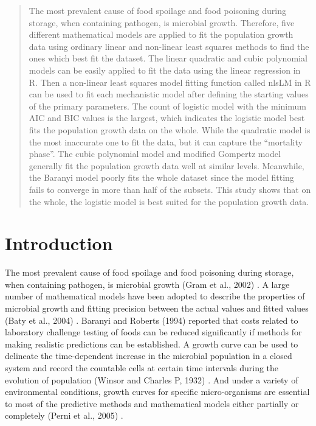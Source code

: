 \documentclass[11pt, a4paper]{article}
\begin{document}

\tableofcontents
\runninglinenumbers
\begin{abstract}
	The most prevalent cause of food spoilage and food poisoning during storage, when containing pathogen, is microbial growth. Therefore, five different mathematical models are applied to fit the population growth data using ordinary linear and non-linear least squares methods to find the ones which best fit the dataset. The linear quadratic and cubic polynomial models can be easily applied to fit the data using the linear regression in R. Then a non-linear least squares model fitting function called nlsLM in R can be used to fit each mechanistic model after defining the starting values of the primary parameters. The count of logistic model with the minimum AIC and BIC values is the largest, which indicates the logistic model best fits the population growth data on the whole. While the quadratic model is the most inaccurate one to fit the data, but it can capture the “mortality phase”. The cubic polynomial model and modified Gompertz model generally fit the population growth data well at similar levels. Meanwhile, the Baranyi model poorly fits the whole dataset since the model fitting fails to converge in more than half of the subsets. This study shows that on the whole, the logistic model is best suited for the population growth data.
\end{abstract}


\section{Introduction}
The most prevalent cause of food spoilage and food poisoning during storage, when containing pathogen, is microbial growth (Gram et al., 2002) \cite{gram2002food}. A large number of mathematical models have been adopted to describe the properties of microbial growth and fitting precision between the actual values and fitted values (Baty et al., 2004) \cite{baty2004estimating}. Baranyi and Roberts (1994) \cite{baranyi1994dynamic} reported that costs related to laboratory challenge testing of foods can be reduced significantly if methods for making realistic predictions can be established. A growth curve can be used to delineate the time-dependent increase in the microbial population in a closed system and record the countable cells at certain time intervals during the evolution of population (Winsor and Charles P, 1932) \cite{winsor1932gompertz}. And under a variety of environmental conditions, growth curves for specific micro-organisms are essential to most of the predictive methods and mathematical models either partially or completely (Perni et al., 2005) \cite{perni2005estimating}.
\end{document}
